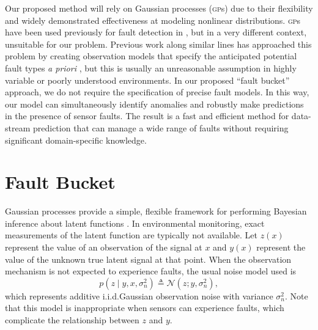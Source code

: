 \documentclass{article}
\newcommand{\deq}{\ensuremath{\triangleq}}
\newcommand{\given}{\ensuremath{\mid}}
\newcommand{\cm}[1]{\ensuremath{\mathcal{#1}}}
\newcommand{\acro}[1]{\textsc{#1}}
\begin{document}
Our proposed method will rely on Gaussian processes (\acro{gp}s) due
to their flexibility and widely demonstrated effectiveness at modeling
nonlinear distributions. \acro{gp}s have been used previously for
fault detection in \citep{Eciolaza2001}, but in a very different
context, unsuitable for our problem. Previous work along similar lines
has approached this problem by creating observation models that
specify
the anticipated potential fault types \textit{a priori}
\citep{garnettosborne}, but this is usually an unreasonable assumption
in highly variable or poorly understood environments. 
In our proposed  ``fault bucket'' approach, we do not require the specification of precise fault models. In
this way, our model can simultaneously identify anomalies and robustly
make predictions in the presence of sensor faults. 
The result is a fast and efficient method for data-stream prediction
that can manage a
wide range of faults without requiring significant
domain-specific knowledge.

\section{Fault Bucket}\label{bucket}
Gaussian processes provide a simple, flexible framework for performing
Bayesian inference about latent functions \citep{gpml}.  In
environmental monitoring, exact measurements of the latent function
are typically not available.
Let $z(x)$ represent the value of an observation of the signal at $x$
and $y(x)$ represent the value of the unknown true latent signal at
that point.  When the observation mechanism is not expected to
experience faults, the usual noise model used is
\begin{equation}\label{iidnoise}
 p(z \given y, x, \sigma_n^2)
 \deq
 \cm{N}(z; y, \sigma_n^2),
\end{equation}
which represents additive i.i.d.\space Gaussian observation noise with
variance $\sigma_n^2$. Note that this model is inappropriate when
sensors can experience faults, which complicate the relationship
between $z$ and $y$.
\end{document}
